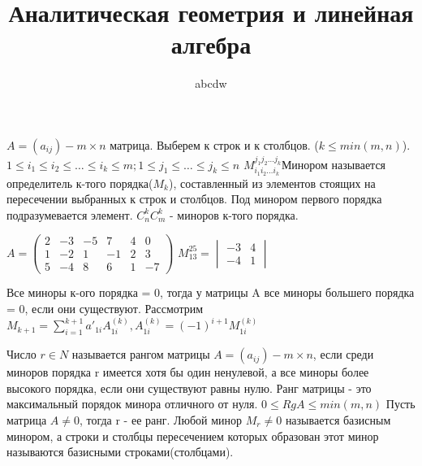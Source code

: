 \documentclass[12pt]{article}
\title{Аналитическая геометрия и линейная алгебра}
\date{}
\author{abcdw}
\begin{document}
    \maketitle
    $A = (a_{ij}) - m \times n$ матрица. \newline
    Выберем к строк и к столбцов. ($k\leq min(m, n)$). \newline
    $1 \leq i_1 \leq i_2 \leq \dots \leq i_k \leq m; 1 \leq j_1 \leq \dots \leq j_k \leq n$ \newline
    $M_{i_1i_2\dots i_k}^{j_1j_2\dots j_k}$Минором называется определитель к-того порядка($M_k$), составленный из элементов стоящих на пересечении выбранных к строк и столбцов. \newline
    Под минором первого порядка подразумевается элемент. \newline
    $C_n^k C_m^k$ - миноров к-того порядка. \newline

    $A = \begin{pmatrix}
        2 & -3 & -5 & 7 & 4 & 0\\
        1 & -2 & 1 & -1 & 2 & 3\\
        5 & -4 & 8 & 6 & 1 & -7
    \end{pmatrix}$
    $M_{13}^{25} = \begin{vmatrix}
        -3 & 4 \\
        -4 & 1
    \end{vmatrix}
    $

    Все миноры к-ого порядка = 0, тогда у матрицы A все миноры большего порядка = 0, если они существуют. \newline
    Рассмотрим $M_{k+1} = \sum\limits_{i=1}^{k + 1} a'_{1i}A_{1i}^{(k)}, A_{1i}^{(k)} = (-1)^{i+1}M_{1i}^{(k)}$ \newline

    Число $r \in N$ называется рангом матрицы $A = (a_{ij}) - m \times n$, если среди миноров порядка r имеется хотя бы один ненулевой, а все миноры более высокого порядка, если они существуют равны нулю. \newline
    Ранг матрицы - это максимальный порядок минора отличного от нуля. \newline
    $0 \leq Rg A \leq min(m, n)$ \newline
    Пусть матрица $A \not = 0$, тогда r - ее ранг. Любой минор $M_r \not = 0$ называется базисным минором, а строки и столбцы пересечением которых образован этот минор называются базисными строками(столбцами). \newline
\end{document}
